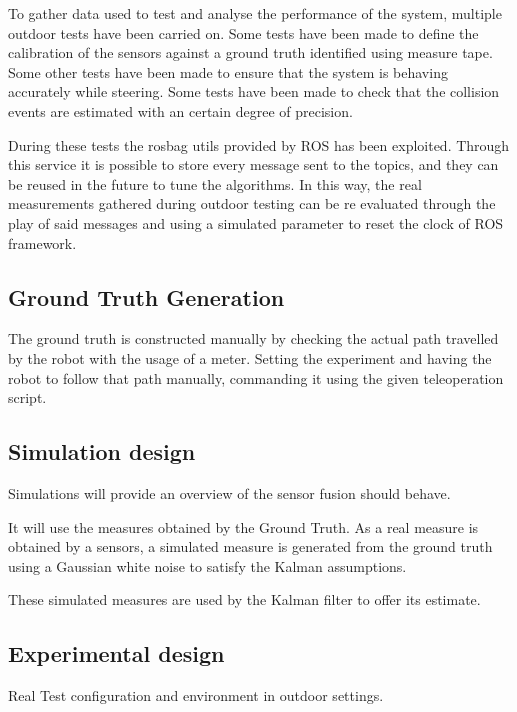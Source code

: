 To gather data used to test and analyse the performance of the system, multiple outdoor tests have been carried on.
Some tests have been made to define the calibration of the sensors against a ground truth identified using measure tape.
Some other tests have been made to ensure that the system is behaving accurately while steering.
Some tests have been made to check that the collision events are estimated with an certain degree of precision.

During these tests the rosbag utils provided by ROS has been exploited. Through this service it is possible to store every message sent to the topics, and they can be reused in the future to tune the algorithms.
In this way, the real measurements gathered during outdoor testing can be re evaluated through the play of said messages and using a simulated parameter to reset the clock of ROS framework.



\subsection{Ground Truth Generation}
\label{sec:gt}


\noindent The ground truth is constructed manually by checking the actual path travelled by the robot with the usage of a meter. Setting the experiment and having the robot to follow that path manually, commanding it using the given teleoperation script.



\subsection{Simulation design}
\label{sec:simDesign}

\noindent Simulations will provide an overview of the sensor fusion should behave.

It will use the measures obtained by the Ground Truth.
As a real measure is obtained by a sensors, a simulated measure is generated from the ground truth using a Gaussian white noise to satisfy the Kalman assumptions.

These simulated measures are used by the Kalman filter to offer its estimate.


\subsection{Experimental design}
\label{sec:experimentalDesign}

\noindent Real Test configuration and environment in outdoor settings.

